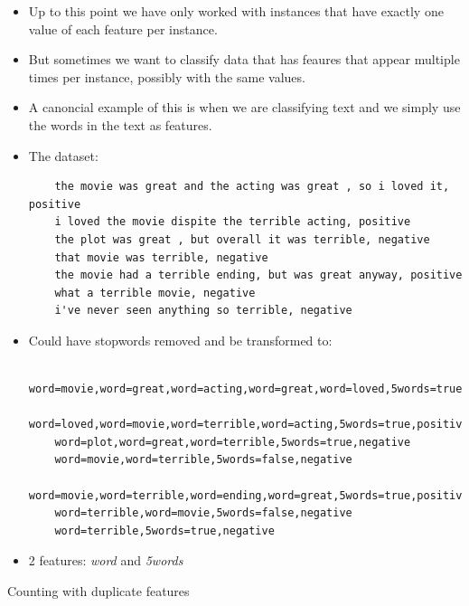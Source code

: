 \documentclass[11pt,letterpaper]{article}
\begin{document}
\begin{itemize}
  \item Up to this point we have only worked with instances that have exactly one value of each feature per instance.
  \item But sometimes we want to classify data that has feaures that appear multiple times per instance, possibly with the same values.
  \item A canoncial example of this is when we are classifying text and we simply use the words in the text as features.

  \item The dataset:
    \begin{verbatim}
    the movie was great and the acting was great , so i loved it, positive
    i loved the movie dispite the terrible acting, positive
    the plot was great , but overall it was terrible, negative
    that movie was terrible, negative
    the movie had a terrible ending, but was great anyway, positive
    what a terrible movie, negative
    i've never seen anything so terrible, negative\end{verbatim}

  \item Could have stopwords removed and be transformed to:
    \begin{verbatim}
    word=movie,word=great,word=acting,word=great,word=loved,5words=true,positive
    word=loved,word=movie,word=terrible,word=acting,5words=true,positive
    word=plot,word=great,word=terrible,5words=true,negative
    word=movie,word=terrible,5words=false,negative
    word=movie,word=terrible,word=ending,word=great,5words=true,positive
    word=terrible,word=movie,5words=false,negative
    word=terrible,5words=true,negative\end{verbatim}

  \item 2 features: \textit{word} and \textit{5words}
\end{itemize}

Counting with duplicate features
\end{document}
